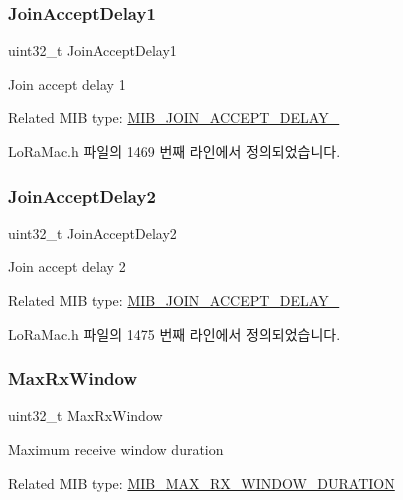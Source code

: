 \subsubsection{\texorpdfstring{Join\+Accept\+Delay1}{JoinAcceptDelay1}}
{\footnotesize\ttfamily uint32\+\_\+t Join\+Accept\+Delay1}

Join accept delay 1

Related M\+IB type\+: \mbox{\hyperlink{group___l_o_r_a_m_a_c_gga32ea83d13a3f5bb4b3ec2ace2319ab61a3fa6b527109f8a6d5994ddaf7e9b0bd1}{M\+I\+B\+\_\+\+J\+O\+I\+N\+\_\+\+A\+C\+C\+E\+P\+T\+\_\+\+D\+E\+L\+A\+Y\+\_}} 

Lo\+Ra\+Mac.\+h 파일의 1469 번째 라인에서 정의되었습니다.

\mbox{\label{unionu_mib_param_ae4a12f9dc83c6cedcf8afc05fb9ea06f}} 
\subsubsection{\texorpdfstring{Join\+Accept\+Delay2}{JoinAcceptDelay2}}
{\footnotesize\ttfamily uint32\+\_\+t Join\+Accept\+Delay2}

Join accept delay 2

Related M\+IB type\+: \mbox{\hyperlink{group___l_o_r_a_m_a_c_gga32ea83d13a3f5bb4b3ec2ace2319ab61aa1ca7d4484b41008a69d5d786cfd6a20}{M\+I\+B\+\_\+\+J\+O\+I\+N\+\_\+\+A\+C\+C\+E\+P\+T\+\_\+\+D\+E\+L\+A\+Y\+\_}} 

Lo\+Ra\+Mac.\+h 파일의 1475 번째 라인에서 정의되었습니다.

\mbox{\label{unionu_mib_param_ace391217d534408b8f2af268a4ef0945}} 
\subsubsection{\texorpdfstring{Max\+Rx\+Window}{MaxRxWindow}}
{\footnotesize\ttfamily uint32\+\_\+t Max\+Rx\+Window}

Maximum receive window duration

Related M\+IB type\+: \mbox{\hyperlink{group___l_o_r_a_m_a_c_gga32ea83d13a3f5bb4b3ec2ace2319ab61ad6ba0cae3e33f0cf042ded8936d965da}{M\+I\+B\+\_\+\+M\+A\+X\+\_\+\+R\+X\+\_\+\+W\+I\+N\+D\+O\+W\+\_\+\+D\+U\+R\+A\+T\+I\+ON}} 

